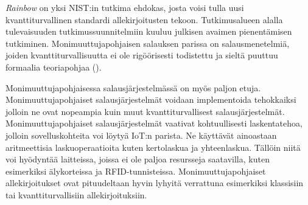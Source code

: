 \emph{Rainbow} on yksi NIST:in tutkima ehdokas, josta voisi tulla uusi kvanttiturvallinen standardi allekirjoitusten tekoon. Tutkimusalueen alalla tulevaisuuden tutkimussuunnitelmiin kuuluu julkisen avaimen pienentämisen tutkiminen. Monimuuttujapohjaisen salauksen parissa on salausmenetelmiä, joiden kvanttiturvallisuutta ei ole rigöörisesti todistettu ja sieltä puuttuu formaalia teoriapohjaa (\cite{8012305}). 

Monimuuttujapohjaisessa salausjärjestelmässä on myös paljon etuja. Monimuuttujapohjaiset salausjärjestelmät voidaan implementoida tehokkaiksi jolloin ne ovat nopeampia kuin muut kvanttiturvallisest salausjärjestelmät. Monimuuttujapohjaiset salausjärjestelmät vaativat kohtuullisesti laskentatehoa, jolloin sovelluskohteita voi löytyä IoT:n parista. Ne käyttävät ainoastaan aritmeettisia laskuoperaatioita kuten kertolaskua ja yhteenlaskua. Tällöin niitä voi hyödyntää laitteissa, joissa ei ole paljoa resursseja saatavilla, kuten esimerkiksi älykorteissa ja RFID-tunnisteissa. Monimuuttujapohjaiset allekirjoitukset ovat pituudeltaan hyvin lyhyitä verrattuna esimerkiksi klassisiin tai kvanttiturvallisiin allekirjoituksiin.
